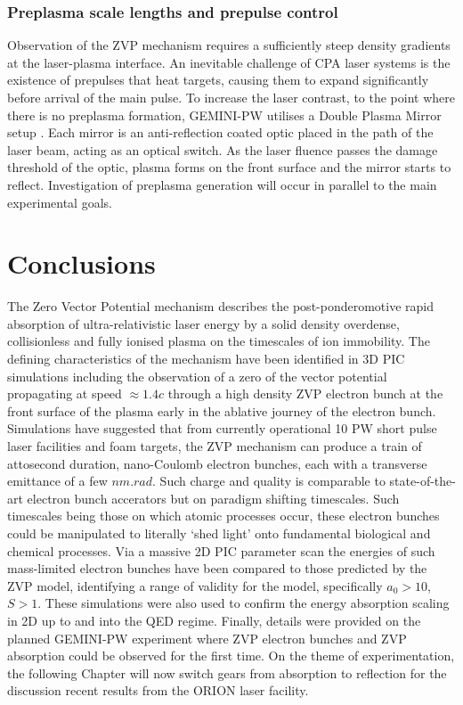 \subsubsection{Preplasma scale lengths and prepulse control}
Observation of the ZVP mechanism requires a sufficiently steep density gradients at the laser-plasma interface. An inevitable challenge of \ac{CPA} laser systems is the existence of prepulses that heat targets, causing them to expand significantly before arrival of the main pulse. To increase the laser contrast, to the point where there is no preplasma formation, GEMINI-PW utilises a Double Plasma Mirror setup \cite{doumyCompleteCharacterizationPlasma2004}. Each mirror is an anti-reflection coated optic placed in the path of the laser beam, acting as an optical switch. As the laser fluence passes the damage threshold of the optic, plasma forms on the front surface and the mirror starts to reflect. Investigation of preplasma generation will occur in parallel to the main experimental goals.

\section{Conclusions}\label{sec:zvp-conclusion}
The Zero Vector Potential mechanism describes the post-ponderomotive rapid absorption of ultra-relativistic laser energy by a solid density overdense, collisionless and fully ionised plasma on the timescales of ion immobility. The defining characteristics of the mechanism have been identified in 3D PIC simulations including the observation of a zero of the vector potential propagating at speed $\approx 1.4c$ through a high density ZVP electron bunch at the front surface of the plasma early in the ablative journey of the electron bunch. Simulations have suggested that from currently operational 10 PW short pulse laser facilities and foam targets, the ZVP mechanism can produce a train of attosecond duration, nano-Coulomb electron bunches, each with a transverse emittance of a few $\unit{nm.rad}$. Such charge and quality is comparable to state-of-the-art electron bunch accerators but on paradigm shifting timescales. Such timescales being those on which atomic processes occur, these electron bunches could be manipulated to literally `shed light' onto fundamental biological and chemical processes. Via a massive 2D PIC parameter scan the energies of such mass-limited electron bunches have been compared to those predicted by the ZVP model, identifying a range of validity for the model, specifically $a_0>10$, $S>1$. These simulations were also used to confirm the energy absorption scaling in 2D up to and into the QED regime. Finally, details were provided on the planned GEMINI-PW experiment where ZVP electron bunches and ZVP absorption could be observed for the first time. On the theme of experimentation, the following Chapter will now switch gears from absorption to reflection for the discussion recent results from the ORION laser facility.